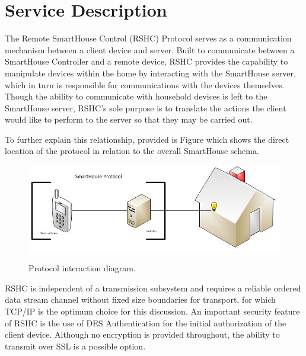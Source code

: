 \section{Service Description}
\label{sec:serv_desc}

The Remote SmartHouse Control (RSHC) Protocol serves as a communication mechanism between a client device and server. Built to communicate between a SmartHouse Controller and a remote device, RSHC provides the capability to manipulate devices within the home by interacting with the SmartHouse server, which in turn is responsible for communications with the devices themselves. Though the ability to communicate with household devices is left to the SmartHouse server, RSHC's sole purpose is to translate the actions the client would like to perform to the server so that they may be carried out.


To further explain this relationship, provided is Figure  which shows the direct location of the protocol in relation to the overall SmartHouse schema.

\begin{figure}[h]
  \centering
  \label{fig:serv_desc:service}
  \includegraphics[width=5in]{figures/desc_img.jpg}\\
  \caption{Protocol interaction diagram.}
\end{figure}

RSHC is independent of a transmission subsystem and requires a reliable ordered data stream channel without fixed size boundaries for transport, for which TCP/IP is the optimum choice for this discussion. An important security feature of RSHC is the use of DES Authentication for the initial authorization of the client device. Although no encryption is provided throughout, the ability to transmit over SSL is a possible option.
